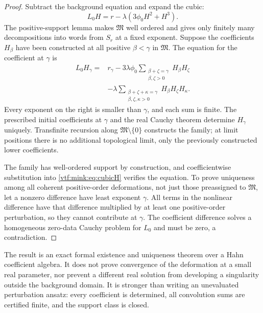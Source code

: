 \documentclass[11pt,letterpaper]{article}
\theoremstyle{definition}
\theoremstyle{remark}
\begin{document}
\begin{proof}
Subtract the background equation and expand the cubic:
\begin{equation}\label{vtf:mink:eq:cubicH}
 L_0H=r-\lambda(3\phi_0H^2+H^3).
\end{equation}
The positive-support lemma makes $\mathfrak M$ well ordered and gives only finitely many decompositions into words from $S_r$ at a fixed exponent. Suppose the coefficients $H_\beta$ have been constructed at all positive $\beta<\gamma$ in $\mathfrak M$. The equation for the coefficient at $\gamma$ is
\begin{equation}\label{vtf:mink:eq:cubicrecursion}
 \begin{split}
 L_0H_\gamma={}&r_\gamma
 -3\lambda\phi_0\sum_{\substack{\beta+\zeta=\gamma\\\beta,\zeta>0}}
 H_\beta H_\zeta\\
 &-\lambda\sum_{\substack{\beta+\zeta+\kappa=\gamma\\\beta,\zeta,\kappa>0}}
 H_\beta H_\zeta H_\kappa.
 \end{split}
\end{equation}
Every exponent on the right is smaller than $\gamma$, and each sum is finite. The prescribed initial coefficients at $\gamma$ and the real Cauchy theorem determine $H_\gamma$ uniquely. Transfinite recursion along $\mathfrak M\setminus\{0\}$ constructs the family; at limit positions there is no additional topological limit, only the previously constructed lower coefficients.

The family has well-ordered support by construction, and coefficientwise substitution into \cref{vtf:mink:eq:cubicH} verifies the equation. To prove uniqueness among all coherent positive-order deformations, not just those preassigned to $\mathfrak M$, let a nonzero difference have least exponent $\gamma$. All terms in the nonlinear difference have that difference multiplied by at least one positive-order perturbation, so they cannot contribute at $\gamma$. The coefficient difference solves a homogeneous zero-data Cauchy problem for $L_0$ and must be zero, a contradiction.
\end{proof}

The result is an exact formal existence and uniqueness theorem over a Hahn coefficient algebra. It does not prove convergence of the deformation at a small real parameter, nor prevent a different real solution from developing a singularity outside the background domain. It is stronger than writing an unevaluated perturbation ansatz: every coefficient is determined, all convolution sums are certified finite, and the support class is closed.
\end{document}

